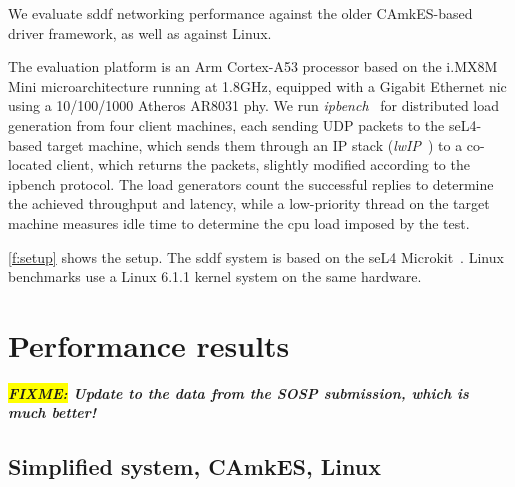 \documentclass[a4paper,12pt]{report}
\newcommand{\FIXME}[1]{\textbf{\textsl{\colorbox{yellow}{FIXME:} #1}}}
\newcommand{\FIXME}[1]{\relax}
\begin{document}
We evaluate \gls{sddf} networking performance against the older CAmkES-based driver
framework, as well as against Linux.

The evaluation platform is an Arm Cortex-A53 processor based on the
i.MX8M Mini microarchitecture running at 1.8GHz, equipped with a
Gigabit Ethernet \gls{nic} using a 10/100/1000 Atheros AR8031 \gls{phy}. We run
\emph{ipbench}~\citep{Wienand_Macpherson_04} for distributed load
generation from four client machines, each sending UDP packets to the
seL4-based target machine, which sends them through an IP stack
(\emph{lwIP}~\citep{Dunkels_01}) to a co-located client, which
returns the packets, slightly modified according to the ipbench protocol.
The load generators count the successful
replies to determine the achieved throughput and latency, while a
low-priority thread on the target machine measures idle time to
determine the \gls{cpu} load imposed by the test.

\autoref{f:setup} shows the setup.
The \gls{sddf} system is based on the seL4 Microkit~\citep{microkit:url}.
Linux benchmarks use a Linux 6.1.1 kernel system on the same hardware.

\section{Performance results}
\FIXME{Update to the data from the SOSP submission, which is much better!}

\subsection{Simplified system, CAmkES, Linux}\label{s:p-camkes}
\end{document}
